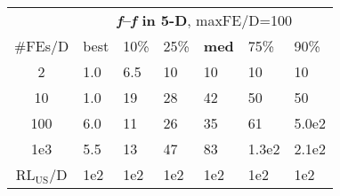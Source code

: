 \begin{tabular}{c|llllll}
 & \multicolumn{6}{|c}{\textbf{\textit{f}\raisebox{-0.35ex}{1}--\textit{f}\raisebox{-0.35ex}{24} in 5-D}, maxFE/D=100}\\
\#FEs/D & best & 10\% & 25\% & \textbf{med} & 75\% & 90\%\\
2 & \hspace*{1ex}1.0 & \hspace*{1ex}6.5 & 10 & 10 & 10 & 10\\
10 & \hspace*{1ex}1.0 & 19 & 28 & 42 & 50 & 50\\
100 & \hspace*{1ex}6.0 & 11 & 26 & 35 & 61 & 5.0e2\\
1e3 & \hspace*{1ex}5.5 & 13 & 47 & 83 & 1.3e2 & 2.1e2\\
$\text{RL}_{\text{US}}$/D & 1e2 & 1e2 & 1e2 & 1e2 & 1e2 & 1e2
\end{tabular}
